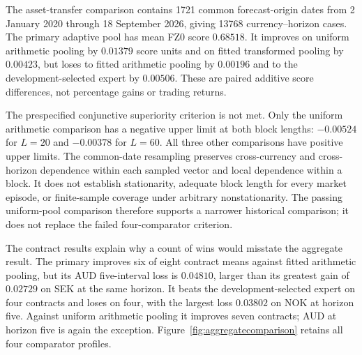 \documentclass[11pt,a4paper]{article}
\theoremstyle{definition}\newtheorem{definition}[theorem]{Definition}
\begin{document}
The asset-transfer comparison contains 1721 common forecast-origin dates from 2 January 2020 through 18 September 2026, giving 13768 currency--horizon cases. The primary adaptive pool has mean FZ0 score $0.68518$. It improves on uniform arithmetic pooling by $0.01379$ score units and on fitted transformed pooling by $0.00423$, but loses to fitted arithmetic pooling by $0.00196$ and to the development-selected expert by $0.00506$. These are paired additive score differences, not percentage gains or trading returns.

\begin{table}[htbp]\centering\small
\caption{Primary adaptive pool minus each frozen comparator, equally weighted over eight contracts and common dates. Negative differences favor the primary. Upper limits are one-sided 95\% percentile limits from 5000 paired circular block resamples at each length $L$; they are approximate historical dependence diagnostics. ``Better/8'' counts negative contract means.}\label{tab:aggregatebootstrap}
\resizebox{\linewidth}{!}{}
\end{table}

The prespecified conjunctive superiority criterion is not met. Only the uniform arithmetic comparison has a negative upper limit at both block lengths: $-0.00524$ for $L=20$ and $-0.00378$ for $L=60$. All three other comparisons have positive upper limits. The common-date resampling preserves cross-currency and cross-horizon dependence within each sampled vector and local dependence within a block. It does not establish stationarity, adequate block length for every market episode, or finite-sample coverage under arbitrary nonstationarity. The passing uniform-pool comparison therefore supports a narrower historical comparison; it does not replace the failed four-comparator criterion.

The contract results explain why a count of wins would misstate the aggregate result. The primary improves six of eight contract means against fitted arithmetic pooling, but its AUD five-interval loss is $0.04810$, larger than its greatest gain of $0.02729$ on SEK at the same horizon. It beats the development-selected expert on four contracts and loses on four, with the largest loss $0.03802$ on NOK at horizon five. Against uniform arithmetic pooling it improves seven contracts; AUD at horizon five is again the exception. Figure~\ref{fig:aggregatecomparison} retains all four comparator profiles.

\begin{table}[htbp]\centering\small
\caption{Common-date contract scores. The primary is the causal adaptive transformed pool with $c=0.1$; each difference subtracts the named comparator from that primary.}\label{tab:aggregatecontracts}
\resizebox{\linewidth}{!}{}
\end{table}
\end{document}
